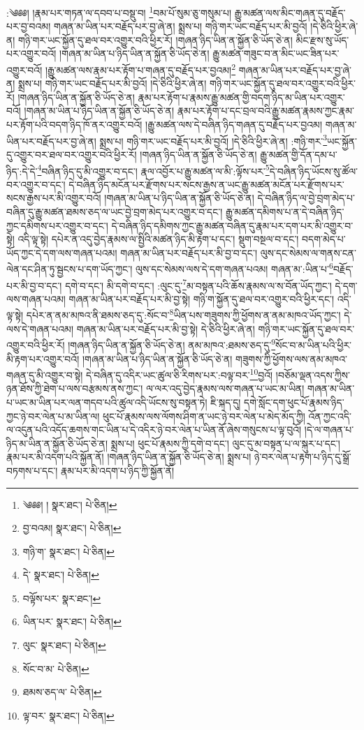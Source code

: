 \setcounter{footnote}{0} 
:༄༅༅། །རྣམ་པར་གཏན་ལ་དབབ་པ་བསྡུ་བ། \footnote{༄༅༅། །   སྣར་ཐང་།  པེ་ཅིན། }བམ་པོ་སུམ་ཅུ་གསུམ་པ། རྒྱུ་མཚན་ལས་མིང་གཞན་དུ་བརྗོད་པར་བྱ་བའམ། གཞན་མ་ཡིན་པར་བརྗོད་པར་བྱ་ཞེ་ན། སྨྲས་པ། གཉི་གར་ཡང་བརྗོད་པར་མི་བྱའོ། །དེ་ཅིའི་ཕྱིར་ཞེ་ན། གཉི་གར་ཡང་སྐྱོན་དུ་ཐལ་བར་འགྱུར་བའི་ཕྱིར་རོ། །གཞན་ཉིད་ཡིན་ན་སྐྱོན་ཅི་ཡོད་ཅེ་ན། མིང་རྫས་སུ་ཡོད་པར་འགྱུར་བའོ། །གཞན་མ་ཡིན་པ་ཉིད་ཡིན་ན་སྐྱོན་ཅི་ཡོད་ཅེ་ན། རྒྱུ་མཚན་གཟུང་བ་ན་མིང་ཡང་ཟིན་པར་འགྱུར་བའོ། །རྒྱུ་མཚན་ལས་རྣམ་པར་རྟོག་པ་གཞན་དུ་བརྗོད་པར་བྱའམ།\footnote{བྱ་བའམ།  སྣར་ཐང་།  པེ་ཅིན། } གཞན་མ་ཡིན་པར་བརྗོད་པར་བྱ་ཞེ་ན། སྨྲས་པ། གཉི་གར་ཡང་བརྗོད་པར་མི་བྱའོ། །དེ་ཅིའི་ཕྱིར་ཞེ་ན། གཉི་གར་ཡང་སྐྱོན་དུ་ཐལ་བར་འགྱུར་བའི་ཕྱིར་རོ། །གཞན་ཉིད་ཡིན་ན་སྐྱོན་ཅི་ཡོད་ཅེ་ན། རྣམ་པར་རྟོག་པ་རྣམས་རྒྱུ་མཚན་གྱི་བདག་ཉིད་མ་ཡིན་པར་འགྱུར་བའོ། །གཞན་མ་ཡིན་པ་ཉིད་ཡིན་ན་སྐྱོན་ཅི་ཡོད་ཅེ་ན། རྣམ་པར་རྟོག་པ་དང་བྲལ་བའི་རྒྱུ་མཚན་རྣམས་ཀྱང་རྣམ་པར་རྟོག་པའི་བདག་ཉིད་ཁོ་ནར་འགྱུར་བའོ། །རྒྱུ་མཚན་ལས་དེ་བཞིན་ཉིད་གཞན་དུ་བརྗོད་པར་བྱའམ། གཞན་མ་ཡིན་པར་བརྗོད་པར་བྱ་ཞེ་ན། སྨྲས་པ། གཉི་གར་ཡང་བརྗོད་པར་མི་བྱའོ། །དེ་ཅིའི་ཕྱིར་ཞེ་ན། :གཉི་གར་\footnote{གཉི་ག་  སྣར་ཐང་།  པེ་ཅིན། }ཡང་སྐྱོན་དུ་འགྱུར་བར་ཐལ་བར་འགྱུར་བའི་ཕྱིར་རོ། །གཞན་ཉིད་ཡིན་ན་སྐྱོན་ཅི་ཡོད་ཅེ་ན། རྒྱུ་མཚན་གྱི་དོན་དམ་པ་ཉིད་:དེ་དེ་\footnote{དེ་  སྣར་ཐང་།  པེ་ཅིན། }བཞིན་ཉིད་དུ་མི་འགྱུར་བ་དང་། རྣལ་འབྱོར་པ་རྒྱུ་མཚན་ལ་མི་:ལྟོས་པར་\footnote{བལྟོས་པར་  སྣར་ཐང་། }དེ་བཞིན་ཉིད་ཡོངས་སུ་ཚོལ་བར་འགྱུར་བ་དང་། དེ་བཞིན་ཉིད་མངོན་པར་རྫོགས་པར་སངས་རྒྱས་ན་ཡང་རྒྱུ་མཚན་མངོན་པར་རྫོགས་པར་སངས་རྒྱས་པར་མི་འགྱུར་བའོ། །གཞན་མ་ཡིན་པ་ཉིད་ཡིན་ན་སྐྱོན་ཅི་ཡོད་ཅེ་ན། དེ་བཞིན་ཉིད་ལ་བྱེ་བྲག་མེད་པ་བཞིན་དུ་རྒྱུ་མཚན་ཐམས་ཅད་ལ་ཡང་བྱེ་བྲག་མེད་པར་འགྱུར་བ་དང་། རྒྱུ་མཚན་དམིགས་པ་ན་དེ་བཞིན་ཉིད་ཀྱང་དམིགས་པར་འགྱུར་བ་དང་། དེ་བཞིན་ཉིད་དམིགས་ཀྱང་རྒྱུ་མཚན་བཞིན་དུ་རྣམ་པར་དག་པར་མི་འགྱུར་བ་སྟེ། འདི་ལྟ་སྟེ། དཔེར་ན་འདུ་བྱེད་རྣམས་ལ་སྤྱིའི་མཚན་ཉིད་མི་རྟག་པ་དང་། སྡུག་བསྔལ་བ་དང་། བདག་མེད་པ་ཡོད་ཀྱང་དེ་དག་ལས་གཞན་པའམ། གཞན་མ་ཡིན་པར་བརྗོད་པར་མི་བྱ་བ་དང་། ལུས་དང་སེམས་ལ་གནས་ངན་ལེན་དང་ཤིན་ཏུ་སྦྱངས་པ་དག་ཡོད་ཀྱང་། ལུས་དང་སེམས་ལས་དེ་དག་གཞན་པའམ། གཞན་མ་:ཡིན་པ་\footnote{ཡིན་པར་  སྣར་ཐང་།  པེ་ཅིན། }བརྗོད་པར་མི་བྱ་བ་དང་། དགེ་བ་དང་། མི་དགེ་བ་དང་། :ལུང་དུ་\footnote{ལུང་  སྣར་ཐང་།  པེ་ཅིན། }མ་བསྟན་པའི་ཆོས་རྣམས་ལ་ས་བོན་ཡོད་ཀྱང་། དེ་དག་ལས་གཞན་པའམ། གཞན་མ་ཡིན་པར་བརྗོད་པར་མི་བྱ་སྟེ། གཉི་ག་སྐྱོན་དུ་ཐལ་བར་འགྱུར་བའི་ཕྱིར་དང་། འདི་ལྟ་སྟེ། དཔེར་ན་ནམ་མཁའ་ནི་ཐམས་ཅད་དུ་:སོང་བ་\footnote{སོང་བ་མ་  པེ་ཅིན། }ཡིན་པས་གཟུགས་ཀྱི་ཕྱོགས་ན་ནམ་མཁའ་ཡོད་ཀྱང་། དེ་ལས་དེ་གཞན་པའམ། གཞན་མ་ཡིན་པར་བརྗོད་པར་མི་བྱ་སྟེ། དེ་ཅིའི་ཕྱིར་ཞེ་ན། གཉི་གར་ཡང་སྐྱོན་དུ་ཐལ་བར་འགྱུར་བའི་ཕྱིར་རོ། །གཞན་ཉིད་ཡིན་ན་སྐྱོན་ཅི་ཡོད་ཅེ་ན། ནམ་མཁའ་:ཐམས་ཅད་དུ་\footnote{ཐམས་ཅད་ལ་  པེ་ཅིན། }སོང་བ་མ་ཡིན་པའི་ཕྱིར་མི་རྟག་པར་འགྱུར་བའོ། །གཞན་མ་ཡིན་པ་ཉིད་ཡིན་ན་སྐྱོན་ཅི་ཡོད་ཅེ་ན། གཟུགས་ཀྱི་ཕྱོགས་ལས་ནམ་མཁའ་གཞན་དུ་མི་འགྱུར་བ་སྟེ། དེ་བཞིན་དུ་འདིར་ཡང་ཚུལ་ཅི་རིགས་པར་:བལྟ་བར་\footnote{ལྟ་བར་  སྣར་ཐང་།  པེ་ཅིན། }བྱའོ། །བཅོམ་ལྡན་འདས་ཀྱིས་ཉན་ཐོས་ཀྱི་ཐེག་པ་ལས་བརྩམས་ནས་ཀྱང་། ལ་ལར་འདུ་བྱེད་རྣམས་ལས་གཞན་པ་ཡང་མ་ཡིན། གཞན་མ་ཡིན་པ་ཡང་མ་ཡིན་པར་ལན་གདབ་པའི་ཚུལ་འདི་ཡོངས་སུ་བསྟན་ཏེ། ཇི་སྐད་དུ། དགེ་སློང་དག་ཕུང་པོ་རྣམས་ཉིད་ཀྱང་ཉེ་བར་ལེན་པ་མ་ཡིན་ལ། ཕུང་པོ་རྣམས་ལས་ལོགས་ཤིག་ན་ཡང་ཉེ་བར་ལེན་པ་མེད་མོད་ཀྱི། འོན་ཀྱང་འདི་ལ་འདུན་པའི་འདོད་ཆགས་གང་ཡིན་པ་དེ་འདིར་ཉེ་བར་ལེན་པ་ཡིན་ནོ་ཞེས་གསུངས་པ་ལྟ་བུའོ། །དེ་ལ་གཞན་པ་ཉིད་མ་ཡིན་ན་སྐྱོན་ཅི་ཡོད་ཅེ་ན། སྨྲས་པ། ཕུང་པོ་རྣམས་ཀྱི་དགེ་བ་དང་། ལུང་དུ་མ་བསྟན་པ་ལ་སྐུར་པ་དང་། རྣམ་པར་མི་འདག་པའི་སྐྱོན་ནོ། །གཞན་ཉིད་ཡིན་ན་སྐྱོན་ཅི་ཡོད་ཅེ་ན། སྨྲས་པ། ཉེ་བར་ལེན་པ་རྟག་པ་ཉིད་དུ་སྒྲོ་བཏགས་པ་དང་། རྣམ་པར་མི་འདག་པ་ཉིད་ཀྱི་སྐྱོན་ནོ། 
